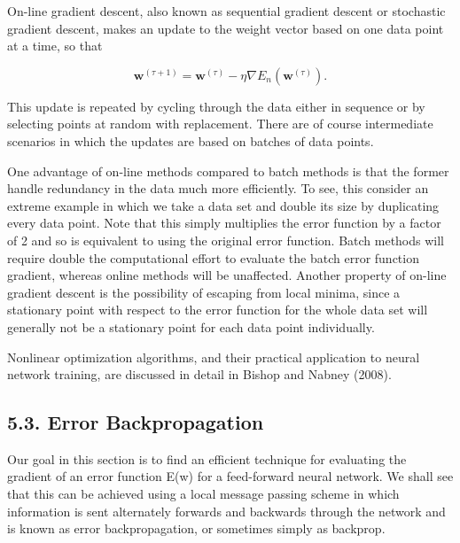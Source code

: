 \documentclass[
  10
]{article}
\begin{document}
On-line gradient descent, also known as sequential gradient descent or
stochastic gradient descent, makes an update to the weight vector based
on one data point at a time, so that

\[
\mathbf {w} ^ {(\tau + 1)} = \mathbf {w} ^ {(\tau)} - \eta \nabla E _ {n} (\mathbf {w} ^ {(\tau)}).\tag{5.43}
\]

This update is repeated by cycling through the data either in sequence
or by selecting points at random with replacement. There are of course
intermediate scenarios in which the updates are based on batches of data
points.

One advantage of on-line methods compared to batch methods is that the
former handle redundancy in the data much more efficiently. To see, this
consider an extreme example in which we take a data set and double its
size by duplicating every data point. Note that this simply multiplies
the error function by a factor of 2 and so is equivalent to using the
original error function. Batch methods will require double the
computational effort to evaluate the batch error function gradient,
whereas online methods will be unaffected. Another property of on-line
gradient descent is the possibility of escaping from local minima, since
a stationary point with respect to the error function for the whole data
set will generally not be a stationary point for each data point
individually.

Nonlinear optimization algorithms, and their practical application to
neural network training, are discussed in detail in Bishop and Nabney
(2008).

\subsection{5.3. Error Backpropagation}\label{error-backpropagation}

Our goal in this section is to find an efficient technique for
evaluating the gradient of an error function E(w) for a feed-forward
neural network. We shall see that this can be achieved using a local
message passing scheme in which information is sent alternately forwards
and backwards through the network and is known as error backpropagation,
or sometimes simply as backprop.
\end{document}
